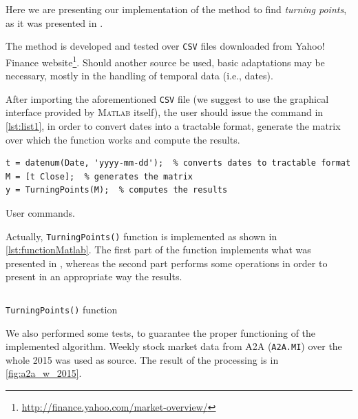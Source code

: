 \documentclass[a4paper]{article}
\newcommand{\matlab}{\textsc{Matlab}\xspace}
\newcommand{\csv}{\texttt{CSV}\xspace}
\begin{document}
Here we are presenting our implementation of the method to find \emph{turning points}, as it was presented in \cite{5961935}.

The method is developed and tested over \csv files downloaded from Yahoo! Finance website\footnote{\url{http://finance.yahoo.com/market-overview/}}. Should another source be used, basic adaptations may be necessary, mostly in the handling of temporal data (i.e., dates). 

After importing the aforementioned \csv file (we suggest to use the graphical interface provided by \matlab itself), the user should issue the command in \cref{lst:list1}, in order to convert dates into a tractable format, generate the matrix over which the function works and compute the results.

\begin{listing}[H]

\begin{verbatim}
t = datenum(Date, 'yyyy-mm-dd');  % converts dates to tractable format
M = [t Close];  % generates the matrix
y = TurningPoints(M);  % computes the results
\end{verbatim}

\caption{User commands.}\label{lst:list1}

\end{listing}

Actually, \texttt{TurningPoints()} function is implemented as shown in \cref{lst:functionMatlab}. The first part of the function implements what was presented in \cite{5961935}, whereas the second part performs some operations in order to present in an appropriate way the results.

\begin{listing}[H]

\inputminted{matlab}{../code/TurningPoints.m}

\caption{\texttt{TurningPoints()} function}\label{lst:functionMatlab}

\end{listing}
 
We also performed some tests, to guarantee the proper functioning of the implemented algorithm. Weekly stock market data from A2A (\texttt{A2A.MI}) over the whole 2015 was used as source. The result of the processing is in \cref{fig:a2a_w_2015}.
\end{document}
